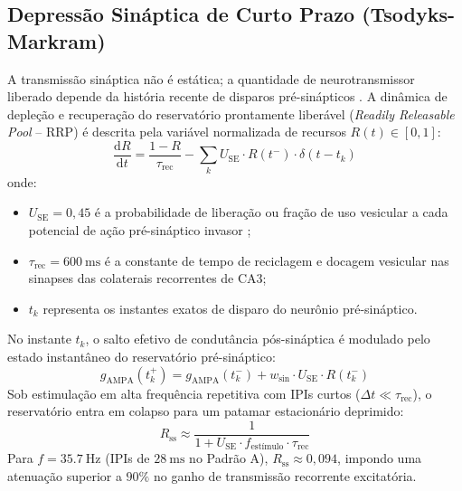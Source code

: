 \documentclass[12pt,openright,oneside,a4paper,brazil]{abntex2}
\begin{document}
\subsection{Depressão Sináptica de Curto Prazo (Tsodyks-Markram)}
A transmissão sináptica não é estática; a quantidade de neurotransmissor liberado depende da história recente de disparos pré-sinápticos \cite{tsodyks1997, tsodyks1998}. A dinâmica de depleção e recuperação do reservatório prontamente liberável (\emph{Readily Releasable Pool} -- RRP) é descrita pela variável normalizada de recursos $R(t) \in [0, 1]$:
\begin{equation}
    \frac{\mathrm{d}R}{\mathrm{d}t} = \frac{1 - R}{\tau_{\text{rec}}} - \sum_{k} U_{\text{SE}} \cdot R(t^-) \cdot \delta(t - t_k) \label{eq:tsodyks}
\end{equation}
onde:
\begin{itemize}
    \item $U_{\text{SE}} = 0{,}45$ é a probabilidade de liberação ou fração de uso vesicular a cada potencial de ação pré-sináptico invasor \cite{tsodyks1998};
    \item $\tau_{\text{rec}} = \qty{600}{\milli\second}$ é a constante de tempo de reciclagem e docagem vesicular nas sinapses das colaterais recorrentes de CA3;
    \item $t_k$ representa os instantes exatos de disparo do neurônio pré-sináptico.
\end{itemize}
No instante $t_k$, o salto efetivo de condutância pós-sináptica é modulado pelo estado instantâneo do reservatório pré-sináptico:
\begin{equation}
    g_{\text{AMPA}}(t_k^+) = g_{\text{AMPA}}(t_k^-) + w_{\text{sin}} \cdot U_{\text{SE}} \cdot R(t_k^-)
\end{equation}
Sob estimulação em alta frequência repetitiva com IPIs curtos ($\Delta t \ll \tau_{\text{rec}}$), o reservatório entra em colapso para um patamar estacionário deprimido:
\begin{equation}
    R_{\text{ss}} \approx \frac{1}{1 + U_{\text{SE}} \cdot f_{\text{estímulo}} \cdot \tau_{\text{rec}}}
\end{equation}
Para $f = \qty{35.7}{\hertz}$ (IPIs de $\qty{28}{\milli\second}$ no Padrão A), $R_{\text{ss}} \approx 0{,}094$, impondo uma atenuação superior a $90\%$ no ganho de transmissão recorrente excitatória.
\end{document}
